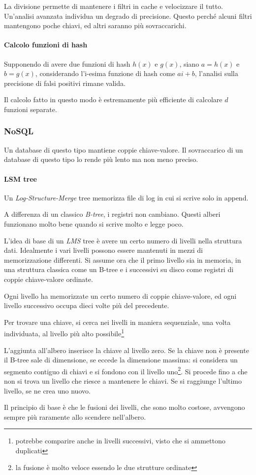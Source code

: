 La divisione permette di mantenere i filtri in cache e velocizzare il tutto. 
Un'analisi avanzata individua un degrado di precisione. Questo perché alcuni filtri 
mantengono poche chiavi, ed altri saranno più sovraccarichi.

\paragraph{Calcolo funzioni di hash}
Supponendo di avere due funzioni di hash $h(x)$ e $g(x)$, siano $a = h(x)$ e 
$b = g(x)$, considerando l'i-esima funzione di hash come $ai + b$, 
l'analisi sulla precisione di falsi positivi rimane valida. 
\begin{remark}
    Il calcolo fatto in questo modo è estremamente più efficiente di calcolare 
    $d$ funzioni separate. 
\end{remark}

\subsubsection{NoSQL}
Un database di questo tipo mantiene coppie chiave-valore. 
Il sovraccarico di un database di questo tipo lo rende più lento ma non meno preciso.

\paragraph{LSM tree}
Un \emph{Log-Structure-Merge} tree memorizza file di log in cui si scrive solo in append. 

A differenza di un classico \emph{B-tree}, i registri non cambiano.
Questi alberi funzionano molto bene quando si scrive molto e legge poco.

L'idea di base di un \emph{LMS} tree è avere un certo numero di livelli nella struttura 
dati. Idealmente i vari livelli possono essere mantenuti in mezzi di memorizzazione 
differenti. 
Si assume ora che il primo livello sia in memoria, in una struttura classica 
come un B-tree e i successivi su disco come registri di coppie chiave-valore ordinate. 

Ogni livello ha memorizzate un certo numero di coppie chiave-valore, ed ogni livello successivo occupa 
dieci volte più del precedente. 

Per trovare una chiave, si cerca nei livelli in maniera sequenziale, una volta individuata, 
al livello più alto possibile\footnote{potrebbe comparire anche in livelli successivi, visto che si ammettono duplicati}

L'aggiunta all'albero inserisce la chiave al livello zero. Se la chiave non è presente il B-tree sale di dimensione, se eccede la dimensione massima: 
si considera un segmento contiguo di chiavi e si fondono con il livello uno\footnote{la fusione 
è molto veloce essendo le due strutture ordinate}.
Si procede fino a che non si trova un livello che riesce a mantenere le chiavi. 
Se si raggiunge l'ultimo livello, se ne crea uno nuovo. 

Il principio di base è che le fusioni dei livelli, che sono molto costose, avvengono sempre 
più raramente allo scendere nell'albero.


